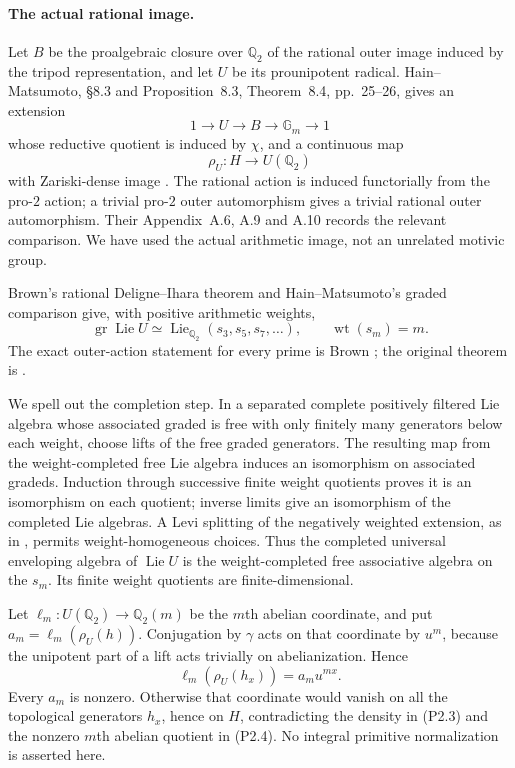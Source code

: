 \documentclass[11pt,a4paper]{article}
\theoremstyle{definition}
\begin{document}
\paragraph{The actual rational image.}
Let $B$ be the proalgebraic closure over $\mathbb Q_2$ of the rational outer image induced by the tripod representation, and let $U$ be its prounipotent radical. Hain--Matsumoto, \S8.3 and Proposition~8.3, Theorem~8.4, pp.~25--26, gives an extension
\[
 1\longrightarrow U\longrightarrow B\longrightarrow\mathbb G_m\longrightarrow1
\]
whose reductive quotient is induced by $\chi$, and a continuous map
\[
 \rho_U:H\longrightarrow U(\mathbb Q_2)                    \tag{P2.3}
\]
with Zariski-dense image \cite{HainMatsumoto2001}. The rational action is induced functorially from the pro-$2$ action; a trivial pro-$2$ outer automorphism gives a trivial rational outer automorphism. Their Appendix~A.6, A.9 and A.10 records the relevant comparison. We have used the actual arithmetic image, not an unrelated motivic group.

Brown's rational Deligne--Ihara theorem and Hain--Matsumoto's graded comparison give, with positive arithmetic weights,
\[
 \operatorname{gr}\operatorname{Lie}U
 \simeq\operatorname{Lie}_{\mathbb Q_2}(s_3,s_5,s_7,\ldots),
 \qquad\operatorname{wt}(s_m)=m.                           \tag{P2.4}
\]
The exact outer-action statement for every prime is Brown \cite[\S2.1, Conjecture~1, p.~2; \S2.3, Theorem~2.1 and following paragraph, p.~4]{Brown2019}; the original theorem is \cite[Theorem~1.1 and its consequence, p.~950]{Brown2012}.

We spell out the completion step. In a separated complete positively filtered Lie algebra whose associated graded is free with only finitely many generators below each weight, choose lifts of the free graded generators. The resulting map from the weight-completed free Lie algebra induces an isomorphism on associated gradeds. Induction through successive finite weight quotients proves it is an isomorphism on each quotient; inverse limits give an isomorphism of the completed Lie algebras. A Levi splitting of the negatively weighted extension, as in \cite[Lemma~3.7, p.~9]{HainMatsumoto2001}, permits weight-homogeneous choices. Thus the completed universal enveloping algebra of $\operatorname{Lie}U$ is the weight-completed free associative algebra on the $s_m$. Its finite weight quotients are finite-dimensional.

Let $\ell_m:U(\mathbb Q_2)\to\mathbb Q_2(m)$ be the $m$th abelian coordinate, and put $a_m=\ell_m(\rho_U(h))$. Conjugation by $\gamma$ acts on that coordinate by $u^m$, because the unipotent part of a lift acts trivially on abelianization. Hence
\[
 \ell_m(\rho_U(h_x))=a_mu^{mx}.                             \tag{P2.5}
\]
Every $a_m$ is nonzero. Otherwise that coordinate would vanish on all the topological generators $h_x$, hence on $H$, contradicting the density in (P2.3) and the nonzero $m$th abelian quotient in (P2.4). No integral primitive normalization is asserted here.
\end{document}
